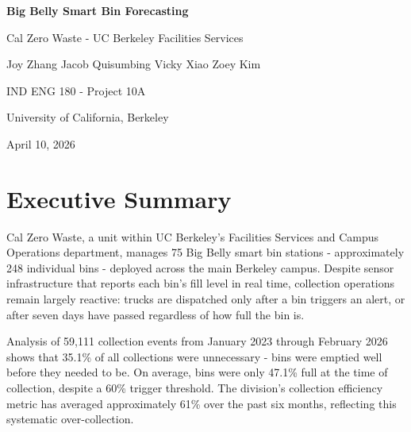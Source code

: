 \documentclass[11pt]{article}
\begin{document}

\begin{titlepage}
  \centering
  \vspace*{3cm}
  {\LARGE\bfseries\color{reportblue} Big Belly Smart Bin Forecasting\par}
  \vspace{0.5cm}
  {\large Cal Zero Waste - UC Berkeley Facilities Services\par}
  \vspace{2.5cm}
  {\normalsize Joy Zhang \quad Jacob Quisumbing \quad Vicky Xiao \quad Zoey Kim\par}
  \vspace{0.4cm}
  {\normalsize IND ENG 180 - Project 10A\par}
  \vspace{0.4cm}
  {\normalsize University of California, Berkeley\par}
  \vspace{0.4cm}
  {\normalsize April 10, 2026\par}
\end{titlepage}

\setcounter{page}{1}

\section*{Executive Summary}

Cal Zero Waste, a unit within UC Berkeley's Facilities Services and Campus Operations
department, manages 75 Big Belly smart bin stations - approximately 248 individual bins -
deployed across the main Berkeley campus. Despite sensor infrastructure that reports each
bin's fill level in real time, collection operations remain largely reactive: trucks are
dispatched only after a bin triggers an alert, or after seven days have passed regardless
of how full the bin is.

Analysis of 59,111 collection events from January 2023 through February 2026 shows that
35.1\% of all collections were unnecessary - bins were emptied well before they needed to
be. On average, bins were only 47.1\% full at the time of collection, despite a 60\%
trigger threshold. The division's collection efficiency metric has averaged approximately
61\% over the past six months, reflecting this systematic over-collection.
\end{document}
